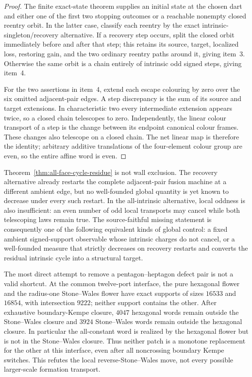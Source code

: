 \begin{proof}
The finite exact-state theorem supplies an initial state at the chosen dart
and either one of the first two stopping outcomes or a reachable nonempty
closed reentry orbit.  In the latter case, classify each reentry by the exact
intrinsic-singleton/recovery alternative.  If a recovery step occurs, split
the closed orbit immediately before and after that step; this retains its
source, target, localized loss, restoring gain, and the two ordinary reentry
paths around it, giving item~3.  Otherwise the same orbit is a chain entirely
of intrinsic odd signed steps, giving item~4.

For the two assertions in item~4, extend each escape colouring by zero over
the six omitted adjacent-pair edges.  A step discrepancy is the sum of its
source and target extensions.  In characteristic two every intermediate
extension appears twice, so a closed chain telescopes to zero.  Independently,
the linear colour transport of a step is the change between its endpoint
canonical colour frames.  These changes also telescope on a closed chain.
The net linear map is therefore the identity; arbitrary additive translations
of the four-element colour group are even, so the entire affine word is even.
\end{proof}

Theorem~\ref{thm:all-face-cycle-residue} is not wall exclusion.  The recovery
alternative already restarts the complete adjacent-pair fusion machine at a
different ambient edge, but no well-founded global quantity is yet known to
decrease under every such restart.  In the all-intrinsic alternative, local
oddness is also insufficient: an even number of odd local transports may
cancel while both telescoping laws remain true.  The source-faithful missing
statement is consequently one of the following equivalent kinds of global
control: a fixed ambient signed-support observable whose intrinsic charges do
not cancel, or a well-founded measure that strictly decreases on recovery
restarts and converts the residual intrinsic cycle into a structural target.

\begin{remark}
The most direct attempt to remove a pentagon--heptagon defect pair is not a
valid shortcut.  At the common twelve-port interface, the pure hexagonal
flower and the radius-one Stone--Wales flower have exact supports of sizes
\(16533\) and \(16854\), with intersection \(9222\); neither support contains
the other.  After exhaustive boundary-Kempe closure, \(4047\) hexagonal words
remain outside the Stone--Wales closure and \(3924\) Stone--Wales words remain
outside the hexagonal closure.  In particular the all-constant word is
realized by the hexagonal flower but is not in the Stone--Wales closure.
Thus neither patch is a monotone replacement for the other at this interface,
even after all noncrossing boundary Kempe switches.  This refutes the local
reverse-Stone--Wales move, not every possible larger-scale formation
transport.
\end{remark}

